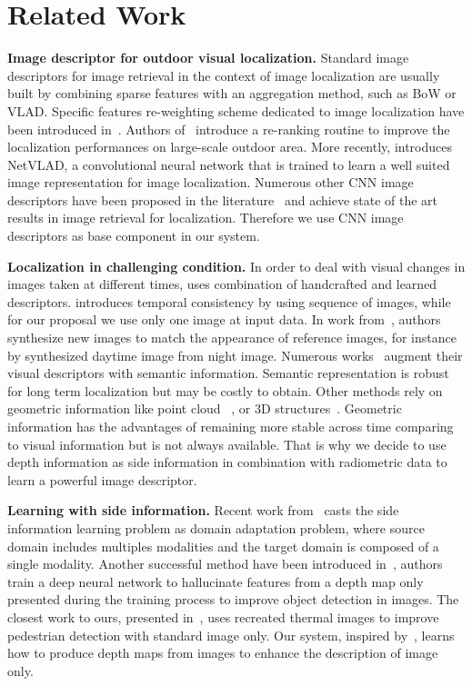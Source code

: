 \section{Related Work}
\label{sec:related_work}

\vspace{4pt}\noindent\textbf{Image descriptor for outdoor visual localization.} Standard image descriptors for image retrieval in the context of image localization are usually built by combining sparse features with an aggregation method, such as BoW or VLAD. Specific features re-weighting scheme dedicated to image localization have been introduced in~\cite{Arandjelovic2014}. Authors of~\cite{Sattler2016} introduce a re-ranking routine to improve the localization performances on large-scale outdoor area. More recently, \cite{Arandjelovic2017} introduces NetVLAD, a convolutional neural network that is trained to learn a well suited image representation for image localization. Numerous other CNN image descriptors have been proposed in the literature~\cite{Kim2017a,Gordo2017,Radenovic2017,Sunderhauf2015a,Liu2018} and achieve state of the art results in image retrieval for localization. Therefore we use CNN image descriptors as base component in our system.

\vspace{4pt}\noindent\textbf{Localization in challenging condition.} In order to deal with visual changes in images taken at different times, \cite{Naseer2018} uses combination of handcrafted and learned descriptors. \cite{Garg2018} introduces temporal consistency by using sequence of images, while for our proposal we use only one image at input data. In work from~\cite{Porav2018}, authors synthesize new images to match the appearance of reference images, for instance by synthesized daytime image from night image. Numerous works~\cite{Stenborg2018,Toft2018,Naseer2017a} augment their visual descriptors with semantic information. Semantic representation is robust for long term localization but may be costly to obtain. Other methods rely on geometric information like point cloud~\cite{Sattler2018,Schonberger2018} , or 3D structures~\cite{Torii2015}. Geometric information has the advantages of remaining more stable across time comparing to visual information but is not always available. That is why we decide to use depth information as side information in combination with radiometric data to learn a powerful image descriptor.

\vspace{4pt}\noindent\textbf{Learning with side information.} Recent work from~\cite{Li2017b} casts the side information learning problem as domain adaptation problem, where source domain includes multiples modalities and the target domain is composed of a single modality. Another successful method have been introduced in~\cite{Hoffman2016}, authors train a deep neural network to hallucinate features from a depth map only presented during the training process to improve object detection in images. The closest work to ours, presented in~\cite{xu2017learning}, uses recreated thermal images to improve pedestrian detection with standard image only. Our system, inspired by~\cite{xu2017learning}, learns how to produce depth maps from images to enhance the description of image only.
